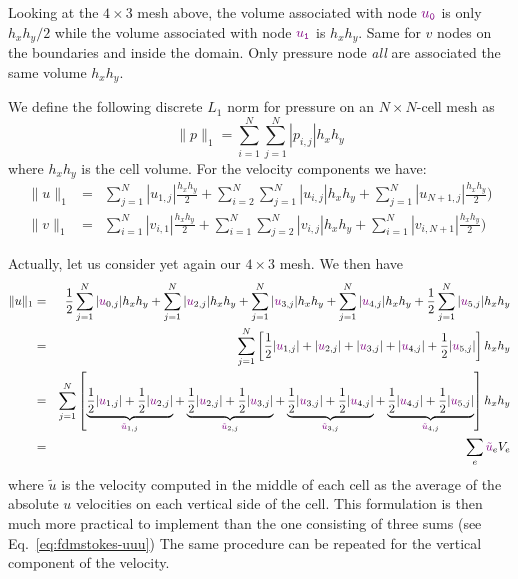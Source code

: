 Looking at the $4 \times 3$ mesh above, the volume associated with node 
${\color{violet} u_{\tt 0}}$ is only $h_xh_y/2$ while the 
volume associated with node ${\color{violet} u_{\tt 1}}$ is $h_xh_y$.
Same for $v$ nodes on the boundaries and inside the domain. 
Only pressure node {\it all} are associated the same volume $h_xh_y$.

We define the following discrete $L_1$ norm for pressure on an $N\times N$-cell
mesh as
\[
\| p \|_1 = \sum_{i=1}^N \sum_{j=1}^N |p_{i,j}| h_x h_y
\]
where $h_xh_y$ is the cell volume. 
For the velocity components we have:
\begin{eqnarray}
\| u \|_1 
&=& \sum_{j=1}^N |u_{1,j}| \frac{h_xh_y}{2}
+ \sum_{i=2}^N \sum_{j=1}^N |u_{i,j}| h_xh_y
+ \sum_{j=1}^N |u_{N+1,j}| \frac{h_xh_y}{2}
\label{eq:fdmstokes-uuu}) \\
\| v \|_1 
&=& \sum_{i=1}^N |v_{i,1}| \frac{h_xh_y}{2}
+ \sum_{i=1}^N \sum_{j=2}^N |v_{i,j}| h_xh_y
+ \sum_{i=1}^N |v_{i,N+1}| \frac{h_xh_y}{2} 
\label{eq:fdmstokes-vvv}) 
\end{eqnarray}

Actually, let us consider yet again our $4\times 3$ mesh.
We then have
\begin{eqnarray}
\| u \|_1 
&=& \frac{1}{2} \sum_{j=1}^N |{\color{violet}u}_{0,j}| h_xh_y
+ \sum_{j=1}^N |{\color{violet}u}_{2,j}| h_xh_y
+ \sum_{j=1}^N |{\color{violet}u}_{3,j}| h_xh_y
+ \sum_{j=1}^N |{\color{violet}u}_{4,j}| h_xh_y
+ \frac{1}{2} \sum_{j=1}^N |{\color{violet}u}_{5,j}| h_xh_y \nonumber\\
&=& \sum_{j=1}^N
\left[
\frac12 |{\color{violet}u}_{1,j}| 
+ |{\color{violet}u}_{2,j}| 
+ |{\color{violet}u}_{3,j}| 
+ |{\color{violet}u}_{4,j}| 
+ \frac12 |{\color{violet}u}_{5,j}|
\right] h_xh_y \nonumber\\
&=& \sum_{j=1}^N
\left[
 \underbrace{\frac12 
|{\color{violet}u}_{1,j}| +\frac12 |{\color{violet}u}_{2,j}|}_{{\color{violet}\tilde{u}}_{1,j}} 
+\underbrace{\frac12 
|{\color{violet}u}_{2,j}| +\frac12 |{\color{violet}u}_{3,j}|}_{{\color{violet}\tilde{u}}_{2,j}} 
+\underbrace{\frac12 
|{\color{violet}u}_{3,j}| +\frac12 |{\color{violet}u}_{4,j}|}_{{\color{violet}\tilde{u}}_{3,j}} 
+\underbrace{\frac12 
|{\color{violet}u}_{4,j}| +\frac12 |{\color{violet}u}_{5,j}|}_{{\color{violet}\tilde{u}}_{4,j}} 
\right] h_xh_y \nonumber\\
&=& \sum_{e} {\color{violet} \tilde{u}}_e V_e 
\end{eqnarray}
where $\tilde{u}$ is the velocity computed in the middle of each 
cell as the average of the absolute $u$ velocities on each vertical 
side of the cell. This formulation is then much more practical 
to implement than the one consisting of three 
sums (see Eq.~\eqref{eq:fdmstokes-uuu})
The same procedure can be repeated  for the vertical component 
of the velocity.

